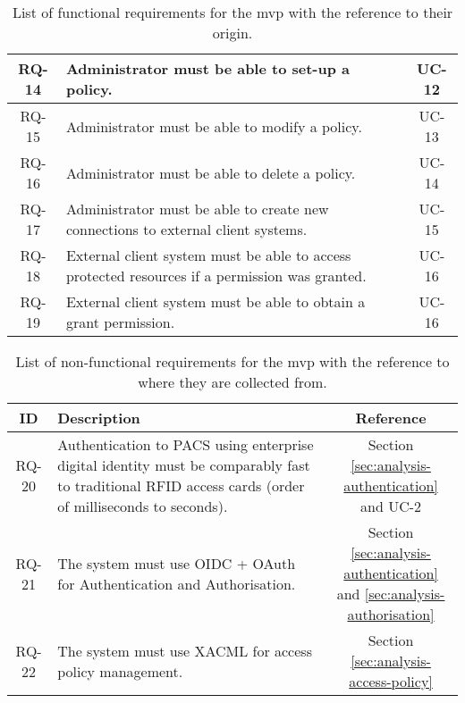 \begin{table}[htbp!]
\begin{tabular}{|c|p{15cm}|c|}
    \hline
    \hline
    RQ-14&Administrator must be able to set-up a policy.&UC-12\\
    \hline
    RQ-15&Administrator must be able to modify a policy.&UC-13\\
    \hline
    RQ-16&Administrator must be able to delete a policy.&UC-14\\
    \hline
    \hline
    RQ-17&Administrator must be able to create new connections to external client systems.&UC-15\\
    \hline
    \hline
    RQ-18&External client system must be able to access protected resources if a permission was granted.&UC-16\\
    \hline
    RQ-19&External client system must be able to obtain a grant permission.&UC-16\\
    \hline
    \end{tabular}
    \caption{List of functional requirements for the \acrshort{mvp} with the reference to their origin.}
    \label{tab:functional-requirements}
\end{table}
% 
\begin{table}[htbp!]
    \footnotesize
    \onehalfspacing
    \centering
    \begin{tabular}{|c|p{15cm}|c|}
    \hline
    \cellcolor[HTML]{CBCEFB}\textbf{ID}&\cellcolor[HTML]{CBCEFB}\textbf{Description}&\cellcolor[HTML]{CBCEFB}\textbf{Reference}\\
    \hline
    RQ-20&Authentication to PACS using enterprise digital identity must be comparably fast to traditional RFID access cards (order of milliseconds to seconds).&\makecell{Section \ref{sec:analysis-authentication} \\ and UC-2}\\
    \hline
    RQ-21&The system must use OIDC + OAuth for Authentication and Authorisation.&\makecell{Section \ref{sec:analysis-authentication} \\ and \ref{sec:analysis-authorisation}}\\
    \hline
    RQ-22&The system must use XACML for access policy management.&Section \ref{sec:analysis-access-policy}\\
    \hline
    \end{tabular}
    \caption{List of non-functional requirements for the \acrshort{mvp} with the reference to where they are collected from.}
    \label{tab:nonfunctional-requirements}
\end{table}